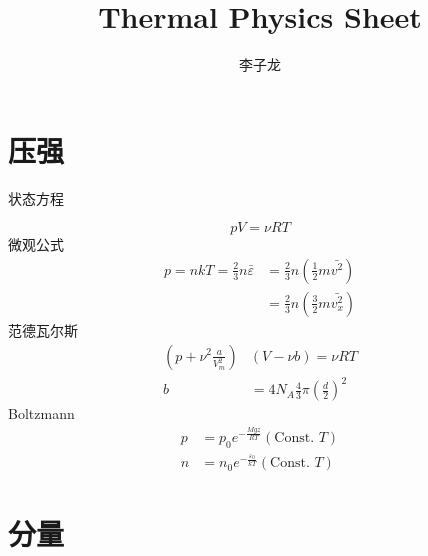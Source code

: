 \documentclass[10pt]{article}
\title{Thermal Physics Sheet}
\author{李子龙}
\date{}
\numberwithin{equation}{section}
\begin{document}
\begin{multicols}{3}
\begin{CJK}{UTF8}{song}
\maketitle
\section{压强}
状态方程

\begin{equation}
  pV=\nu RT
\end{equation}
微观公式
\begin{align}\nonumber
  p=nkT=\frac{2}{3}n\bar{\varepsilon}&=\frac{2}{3}n\left(\frac{1}{2}m\bar{v^2}\right) \\ &=\frac{2}{3}n\left(\frac{3}{2}m\bar{v_x^2}\right)
\end{align}
范德瓦尔斯
\begin{align}
  \left(p+\nu^2 \frac{a}{V_m^2}\right)&(V-\nu b)=\nu RT \\
  b&=4N_A \frac{4}{3}\pi \left( \frac{d}{2} \right)^2
\end{align}
Boltzmann
\begin{align}
p&=p_0 e^{-\frac{Mgz}{RT}}(\textrm{Const. }T) \\
n&=n_0 e^{-\frac{\varepsilon_0}{kT}}(\textrm{Const. }T)
\end{align}
\section{分量}


\end{CJK}
\end{multicols}
\end{document}
